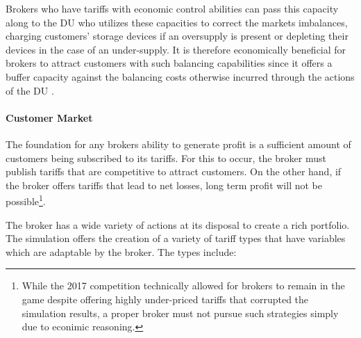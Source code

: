 Brokers who have tariffs with economic control abilities can pass this capacity along to the \ac{DU} who utilizes these
capacities to correct the markets imbalances, charging customers' storage devices if an oversupply is present or
depleting their devices in the case of an under-supply. It is therefore economically beneficial for brokers to attract
customers with such balancing capabilities since it offers a buffer capacity against the balancing costs otherwise
incurred through the actions of the \ac{DU} \citep[p.5]{ketter2018powertac}.

\paragraph{Customer Market}

The foundation for any brokers ability to generate profit is a sufficient amount of customers being subscribed to its tariffs. For
this to occur, the broker must publish tariffs that are competitive to attract customers. On the other hand, if the
broker offers tariffs that lead to net losses, long term profit will not be possible\footnote{While the 2017
    competition technically allowed for brokers to remain in the game despite offering highly under-priced tariffs that
    corrupted the simulation results, a proper broker must not pursue such strategies simply due to econimic
reasoning.}.

The broker has a wide variety of actions at its disposal to create a rich portfolio. The simulation offers the
creation of a variety of tariff types that have variables which are adaptable by the broker. The types include:

